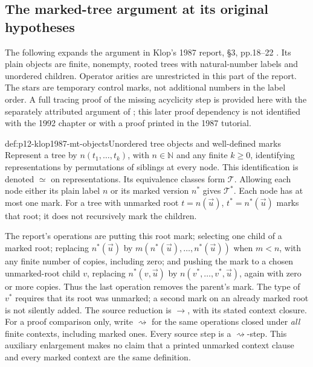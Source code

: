 \subsection{The marked-tree argument at its original hypotheses}
\label{sec:p12-klop1987-marked-tree-proofs}

The following expands the argument in Klop's 1987 report,
\S3, pp.18--22 \parencite{Klop1987CWITutorial}. Its plain objects are
finite, nonempty, rooted trees with natural-number labels and unordered
children. Operator arities are unrestricted in this part of the report.
The stars are temporary control marks, not additional numbers in the
label order. A full tracing proof of the missing acyclicity step is
provided here with the separately attributed argument of
\textcite[\S4.3]{EndrullisKlopOverbeek2021MarkedTrees}; this later proof
dependency is not identified with the 1992 chapter or with a proof
printed in the 1987 tutorial.

\begin{hbdefinition}{def:p12-klop1987-mt-objects}{Unordered tree objects and well-defined marks}
Represent a tree by \(n(t_1,\ldots,t_k)\), with \(n\in\mathbb N\)
and any finite \(k\geq0\), identifying representations by permutations
of siblings at every node. This identification is denoted \(\simeq\)
on representations. Its equivalence classes form \(\mathcal T\).
Allowing each node either its plain label \(n\) or its marked version
\(n^*\) gives \(\mathcal T^*\). Each node has at most one mark.
For a tree with unmarked root \(t=n(\vec u)\), \(t^*=n^*(\vec u)\)
marks that root; it does not recursively mark the children.

The report's operations are putting this root mark; selecting one
child of a marked root; replacing \(n^*(\vec u)\) by
\(m(n^*(\vec u),\ldots,n^*(\vec u))\) when \(m<n\), with any
finite number of copies, including zero; and pushing the mark to a
chosen unmarked-root child \(v\), replacing
\(n^*(v,\vec u)\) by \(n(v^*,\ldots,v^*,\vec u)\), again with
zero or more copies. Thus the last operation removes the parent's mark.
The type of \(v^*\) requires that its root was unmarked; a second mark
on an already marked root is not silently added.
The source reduction is \(\to\), with its stated context closure.
For a proof comparison only, write \(\rightsquigarrow\) for the
same operations closed under \emph{all} finite contexts, including
marked ones. Every source step is a \(\rightsquigarrow\)-step.
This auxiliary enlargement makes no claim that a printed unmarked
context clause and every marked context are the same definition.
\end{hbdefinition}

